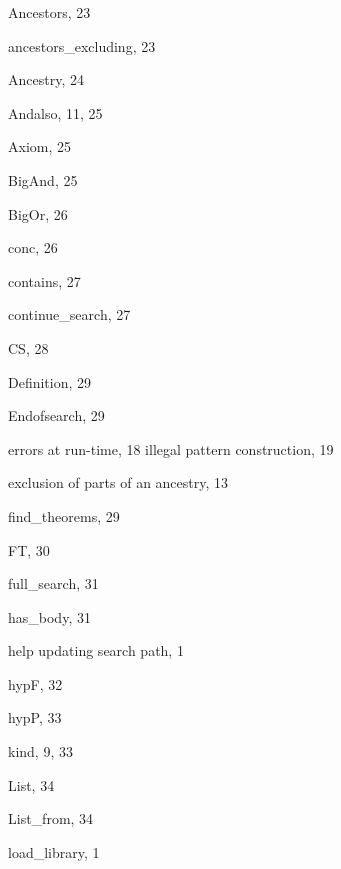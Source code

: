 \begin{theindex}

  \item {\ptt Ancestors}, 23
  \item {\ptt ancestors\_excluding}, 23
  \item {\ptt Ancestry}, 24
  \item {\ptt Andalso}, 11, 25
  \item {\ptt Axiom}, 25

  \indexspace

  \item {\ptt BigAnd}, 25
  \item {\ptt BigOr}, 26

  \indexspace

  \item {\ptt conc}, 26
  \item {\ptt contains}, 27
  \item {\ptt continue\_search}, 27
  \item {\ptt CS}, 28

  \indexspace

  \item {\ptt Definition}, 29

  \indexspace

  \item {\ptt Endofsearch}, 29
  \item errors
    \subitem at run-time, 18
    \subitem illegal pattern construction, 19
  \item exclusion
    \subitem of parts of an ancestry, 13

  \indexspace

  \item {\ptt find\_theorems}, 29
  \item {\ptt FT}, 30
  \item {\ptt full\_search}, 31

  \indexspace

  \item {\ptt has\_body}, 31
  \item help
    \subitem updating search path, 1
  \item {\ptt hypF}, 32
  \item {\ptt hypP}, 33

  \indexspace

  \item {\ptt kind}, 9, 33

  \indexspace

  \item {\ptt List}, 34
  \item {\ptt List\_from}, 34
  \item {\ptt load\_library}, 1


\end{theindex}

